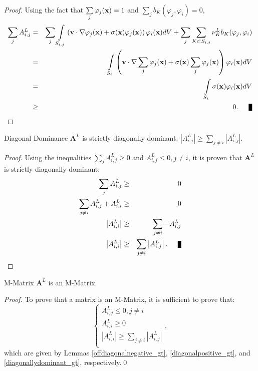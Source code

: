 \begin{proof}
Using the fact that $\sum\limits_j\varphi_j(\mathbf{x})=1$ and
$\sum\limits_j b_K(\varphi_j,\varphi_i)=0$,
\begin{eqnarray*}
   \sumj A^L_{i,j} & = & \sumj \intSij
      \left(\v\cdot\nabla\varphi_j(\x) +
      \sigma(\x)\varphi_j(\x)\right)\varphi_i(\x) dV +
      \sumj\sumKSij\nu_K^L b_K(\varphi_j, \varphi_i)\\
   & = & \intSi\left(\v\cdot
      \nabla\sumj\varphi_j(\x) +
      \sigma(\x)\sumj\varphi_j(\x)\right)
      \varphi_i(\x) dV\\
   \label{gtrowsum} & = & \intSi\sigma(\x)\varphi_i(\x) dV\\
   &\ge& 0.\qed
\end{eqnarray*}
\end{proof}
\begin{lemma}[label={diagonallydominant_gt}]{Diagonal Dominance}
   $\mathbf{A}^L$ is strictly diagonally dominant:
   $\left|A^L_{i,i}\right| \ge \sum\limits_{j\ne i} \left|A^L_{i,j}\right|$.
\end{lemma}
\begin{proof}
Using the inequalities $\sum\limits_j A^L_{i,j} \ge 0$ and $A^L_{i,j}\le 0, j\ne i$,
it is proven that $\mathbf{A}^L$ is strictly diagonally dominant:
\begin{eqnarray*}
	\sum\limits_j A^L_{i,j} & \ge & 0\\
	\sum\limits_{j\ne i} A^L_{i,j} + A^L_{i,i} & \ge & 0\\
	\left|A^L_{i,i}\right| & \ge & \sum\limits_{j\ne i} -A^L_{i,j}\\
	\left|A^L_{i,i}\right| & \ge & \sum\limits_{j\ne i} \left|A^L_{i,j}\right|.\qed
\end{eqnarray*}
\end{proof}
\begin{lemma}{M-Matrix}
   $\mathbf{A}^L$ is an M-Matrix.
\end{lemma}
\begin{proof}
To prove that a matrix is an M-Matrix, it is sufficient to prove that:
\[
\left\{\begin{array}{l}
A^L_{i,j}\le 0, j\ne i\\
A^L_{i,i}\ge 0\\
\left|A^L_{i,i}\right| \ge \sum\limits_{j\ne i} \left|A^L_{i,j}\right|\\
\end{array}
\right.,
\]
which are given by Lemmas \ref{offdiagonalnegative_gt}, \ref{diagonalpositive_gt}, and
\ref{diagonallydominant_gt}, respectively.\qed
\end{proof}
